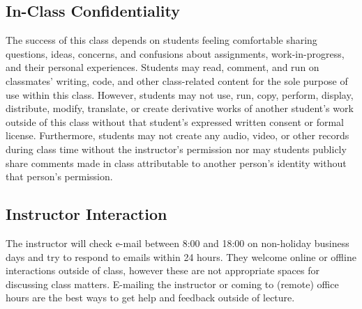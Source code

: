 \documentclass[10pt]{memoir}
\begin{document}
\subsection{In-Class Confidentiality}
The success of this class depends on students feeling comfortable sharing questions, ideas, concerns, and confusions about assignments, work-in-progress, and their personal experiences. Students may read, comment, and run on classmates' writing, code, and other class-related content for the sole purpose of use within this class. However, students may not use, run, copy, perform, display, distribute, modify, translate, or create derivative works of another student's work outside of this class without that student's expressed written consent or formal license. Furthermore, students may not create any audio, video, or other records during class time without the instructor's permission nor may students publicly share comments made in class attributable to another person's identity without that person's permission.


\subsection{Instructor Interaction}
The instructor will check e-mail between 8:00 and 18:00 on non-holiday business days and try to respond to emails within 24 hours. They welcome online or offline interactions outside of class, however these are not appropriate spaces for discussing class matters. E-mailing the instructor or coming to (remote) office hours are the best ways to get help and feedback outside of lecture.
\end{document}
